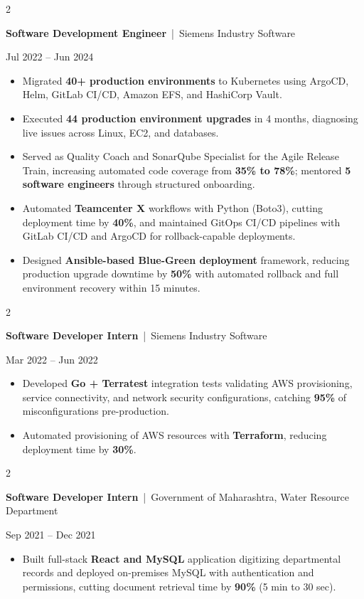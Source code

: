 \documentclass[10pt, letterpaper]{article}
\newenvironment{highlights}{
    \begin{itemize}[
        topsep=0.10 cm,
        parsep=0.06 cm,
        partopsep=0pt,
        itemsep=0.06 cm,
        leftmargin=12pt
    ]
}{
    \end{itemize}
}
\newenvironment{twocolentry}[2][]{
    \onecolentry
    \def\secondColumn{#2}
    \setcolumnwidth{\fill, 4.5 cm}
    \begin{paracol}{2}
}{
    \switchcolumn \raggedleft \secondColumn
    \end{paracol}
    \endonecolentry
}
\begin{document}
\vspace{0.15 cm}

\begin{twocolentry}{Jul 2022 -- Jun 2024}
\textbf{Software Development Engineer} \,|\, Siemens Industry Software
\end{twocolentry}
\begin{highlights}
  \item Migrated \textbf{40+ production environments} to Kubernetes using ArgoCD, Helm, GitLab CI/CD, Amazon EFS, and HashiCorp Vault.
  \item Executed \textbf{44 production environment upgrades} in 4 months, diagnosing live issues across Linux, EC2, and databases.
  \item Served as Quality Coach and SonarQube Specialist for the Agile Release Train, increasing automated code coverage from \textbf{35\% to 78\%}; mentored \textbf{5 software engineers} through structured onboarding.
  \item Automated \textbf{Teamcenter X} workflows with Python (Boto3), cutting deployment time by \textbf{40\%}, and maintained GitOps CI/CD pipelines with GitLab CI/CD and ArgoCD for rollback-capable deployments.
  \item Designed \textbf{Ansible-based Blue-Green deployment} framework, reducing production upgrade downtime by \textbf{50\%} with automated rollback and full environment recovery within 15 minutes.
\end{highlights}

\vspace{0.15 cm}

\begin{twocolentry}{Mar 2022 -- Jun 2022}
\textbf{Software Developer Intern} \,|\, Siemens Industry Software
\end{twocolentry}
\begin{highlights}
  \item Developed \textbf{Go + Terratest} integration tests validating AWS provisioning, service connectivity, and network security configurations, catching \textbf{95\%} of misconfigurations pre-production.
  \item Automated provisioning of AWS resources with \textbf{Terraform}, reducing deployment time by \textbf{30\%}.
\end{highlights}

\vspace{0.15 cm}

\begin{twocolentry}{Sep 2021 -- Dec 2021}
\textbf{Software Developer Intern} \,|\, Government of Maharashtra, Water Resource Department
\end{twocolentry}
\begin{highlights}
  \item Built full-stack \textbf{React and MySQL} application digitizing departmental records and deployed on-premises MySQL with authentication and permissions, cutting document retrieval time by \textbf{90\%} (5 min to 30 sec).
\end{highlights}
\end{document}

